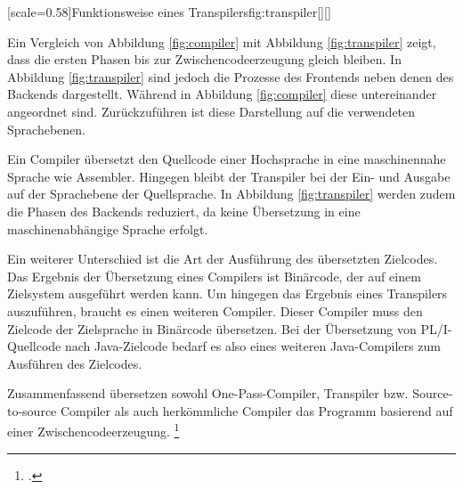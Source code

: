 [scale=0.58]{Funktionsweise eines Transpilers}{fig:transpiler}[][]
\pagebreak

Ein Vergleich von Abbildung \ref{fig:compiler} mit Abbildung \ref{fig:transpiler} zeigt, dass die ersten Phasen bis zur Zwischencodeerzeugung gleich bleiben. In Abbildung \ref{fig:transpiler} sind jedoch die Prozesse des Frontends neben denen des Backends dargestellt. Während in Abbildung \ref{fig:compiler} diese untereinander angeordnet sind. Zurückzuführen ist diese Darstellung auf die verwendeten Sprachebenen.

Ein Compiler übersetzt den Quellcode einer Hochsprache in eine maschinennahe Sprache wie Assembler. Hingegen bleibt der Transpiler bei der Ein- und Ausgabe auf der Sprachebene der Quellsprache. In Abbildung \ref{fig:transpiler} werden zudem die Phasen des Backends reduziert, da keine Übersetzung in eine maschinenabhängige Sprache erfolgt.

Ein weiterer Unterschied ist die Art der Ausführung des übersetzten Zielcodes.
Das Ergebnis der Übersetzung eines Compilers ist Binärcode, der auf einem Zielsystem ausgeführt werden kann. Um hingegen das Ergebnis eines Transpilers auszuführen,
braucht es einen weiteren Compiler. Dieser Compiler muss den Zielcode der Zielsprache in Binärcode übersetzen.
Bei der Übersetzung von PL/I-Quellcode nach Java-Zielcode bedarf es also eines weiteren Java-Compilers zum Ausführen des Zielcodes.



Zusammenfassend übersetzen sowohl One-Pass-Compiler, Transpiler bzw. Source-to-source Compiler als auch herkömmliche Compiler das Programm basierend auf einer Zwischencodeerzeugung. \footcite[Vgl. ][S. 18ff. ]{assambly}

